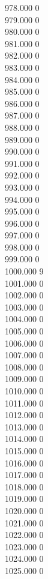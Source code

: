 { 978.000	0 \\
 979.000	0 \\
 980.000	0 \\
 981.000	0 \\
 982.000	0 \\
 983.000	0 \\
 984.000	0 \\
 985.000	0 \\
 986.000	0 \\
 987.000	0 \\
 988.000	0 \\
 989.000	0 \\
 990.000	0 \\
 991.000	0 \\
 992.000	0 \\
 993.000	0 \\
 994.000	0 \\
 995.000	0 \\
 996.000	0 \\
 997.000	0 \\
 998.000	0 \\
 999.000	0 \\
 1000.000	9 \\
 1001.000	0 \\
 1002.000	0 \\
 1003.000	0 \\
 1004.000	0 \\
 1005.000	0 \\
 1006.000	0 \\
 1007.000	0 \\
 1008.000	0 \\
 1009.000	0 \\
 1010.000	0 \\
 1011.000	0 \\
 1012.000	0 \\
 1013.000	0 \\
 1014.000	0 \\
 1015.000	0 \\
 1016.000	0 \\
 1017.000	0 \\
 1018.000	0 \\
 1019.000	0 \\
 1020.000	0 \\
 1021.000	0 \\
 1022.000	0 \\
 1023.000	0 \\
 1024.000	0 \\
 1025.000	0 \\
}
